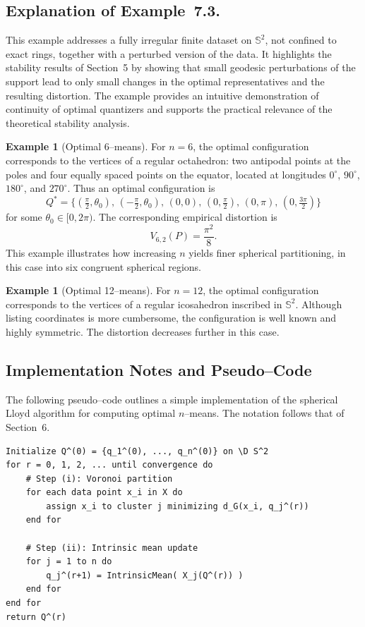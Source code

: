 \documentclass[12pt, reqno]{amsart}
\theoremstyle{plain}
\theoremstyle{definition}
\newtheorem{exam}[subsection]{Example}
\newcommand{\D}[1]{\mathbb{#1}}%
\begin{document}
\subsection*{Explanation of Example~7.3.}
This example addresses a fully irregular finite dataset on $\D S^2$, not confined
to exact rings, together with a perturbed version of the data. It highlights the
stability results of Section~5 by showing that small geodesic perturbations of
the support lead to only small changes in the optimal representatives and the
resulting distortion. The example provides an intuitive demonstration of
continuity of optimal quantizers and supports the practical relevance of the
theoretical stability analysis.
\begin{exam}[Optimal 6--means]\label{ex:6means}
For $n=6$, the optimal configuration corresponds to the vertices of a regular octahedron: two antipodal points at the poles and four equally spaced points on the equator, located at longitudes $0^\circ$, $90^\circ$, $180^\circ$, and $270^\circ$. Thus an optimal configuration is
\[
Q^*=\bigl\{(\tfrac{\pi}{2},\theta_0),\,(-\tfrac{\pi}{2},\theta_0),\,(0,0),\,(0,\tfrac{\pi}{2}),\,(0,\pi),\,(0,\tfrac{3\pi}{2})\bigr\}
\]
for some $\theta_0\in[0,2\pi)$. 
The corresponding empirical distortion is
\[
V_{6,2}(P)=\frac{\pi^2}{8}.
\]
This example  illustrates how increasing $n$ yields finer spherical partitioning, in this case into six congruent spherical regions.
\end{exam}
 

\begin{exam} [Optimal 12--means]
For $n=12$, the optimal configuration corresponds to the vertices of a regular icosahedron inscribed in $\D S^2$.
Although listing coordinates is more cumbersome, the configuration is well known and highly symmetric. The
distortion decreases further in this case.
\end{exam} 
\medskip

\subsection{Implementation Notes and Pseudo--Code}
The following pseudo--code outlines a simple implementation of the spherical Lloyd algorithm for computing optimal
$n$--means. The notation follows that of Section~6.

\medskip

\begin{verbatim}
Initialize Q^(0) = {q_1^(0), ..., q_n^(0)} on \D S^2
for r = 0, 1, 2, ... until convergence do
    # Step (i): Voronoi partition
    for each data point x_i in X do
        assign x_i to cluster j minimizing d_G(x_i, q_j^(r))
    end for

    # Step (ii): Intrinsic mean update
    for j = 1 to n do
        q_j^(r+1) = IntrinsicMean( X_j(Q^(r)) )
    end for
end for
return Q^(r)
\end{verbatim}
\end{document}
